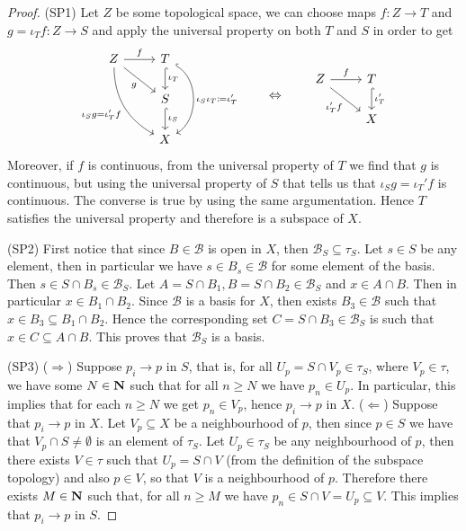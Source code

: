 \begin{proof}
    (SP1) Let \(Z\) be some topological space, we can choose maps \(f: Z \to T\)
    and \(g = \iota_T  f : Z \to S\) and apply the universal property on both
    \(T\) and \(S\) in order to get
    \[
        \begin{tikzcd}
            Z \ar[r,"f"]
            \ar[rd, swap, "g"]
            \ar[rdd, swap, bend right,
                "\iota_S  g = \iota_T'  f"]
            &T \ar[d, hook, "\iota_T"]
            \ar[dd, hook, bend left = 60, "\iota_S  \iota_T \coloneq \iota_T'"]\\
            &S \ar[d, hook, "\iota_S"] \\
            &X
        \end{tikzcd}
        \qquad \Leftrightarrow \qquad
        \begin{tikzcd}
            Z \ar[dr, swap, "\iota_T'  f"] \ar[r, "f"]
            &T \ar[d, hook, "\iota_T'"] \\
            &X
        \end{tikzcd}
    \]
    Moreover, if \(f\) is continuous, from the universal property of \(T\) we find
    that \(g\) is continuous, but using the universal property of \(S\) that tells
    us that \(\iota_S  g = \iota_T' f\) is continuous. The converse is
    true by using the same argumentation. Hence \(T\) satisfies the universal
    property and therefore is a subspace of \(X\).

    (SP2) First notice that since \(B \in \mathcal B\) is open in \(X\), then
    \(\mathcal B_S \subseteq \tau_S\). Let \(s \in S\) be any element, then in
    particular we have \(s \in B_s \in \mathcal B\) for some element of the
    basis. Then \(s \in S \cap B_s \in \mathcal B_S\). Let
    \(A = S \cap B_1, B = S \cap B_2 \in \mathcal B_S\) and \(x \in A \cap B\). Then
    in particular \(x \in B_1 \cap B_2\). Since \(\mathcal B\) is a basis for \(X\),
    then exists \(B_3 \in \mathcal B\) such that
    \(x \in B_3 \subseteq B_1 \cap B_2\). Hence the corresponding set
    \(C = S \cap B_3 \in \mathcal B_S\) is such that \(x \in C \subseteq A \cap
    B\). This proves that \(\mathcal B_S\) is a basis.

    (SP3) (\(\Rightarrow\)) Suppose \(p_i \to p\) in \(S\), that is, for all
    \(U_p = S \cap V_p \in \tau_S\), where \(V_p \in \tau\), we have
    some \(N \in \mathbf{N}\) such that for all \(n \geq N\) we have \(p_n \in U_p\). In
    particular, this implies that for each \(n \geq N\) we get \(p_n \in V_p\),
    hence \(p_i \to p\) in \(X\).  (\(\Leftarrow\)) Suppose that \(p_i \to p\) in
    \(X\). Let \(V_p \subseteq X\) be a neighbourhood of \(p\), then since
    \(p \in S\) we have that \(V_p \cap S \neq \emptyset\) is an element of
    \(\tau_S\). Let \(U_p \in \tau_S\) be any neighbourhood of \(p\),
    then there exists \(V \in \tau\) such that \(U_p = S \cap V\) (from the
    definition of the subspace topology) and also \(p \in V\), so that \(V\) is a
    neighbourhood of \(p\).  Therefore there exists \(M \in \mathbf{N}\) such that, for all
    \(n \geq M\) we have \(p_n \in S \cap V = U_p \subseteq V\). This implies that
    \(p_i \to p\) in \(S\).


\end{proof}
